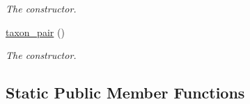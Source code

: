 \begin{DoxyCompactItemize}
\begin{DoxyCompactList}\small\item\em The constructor. \end{DoxyCompactList}\item 
\hypertarget{classtaxon__pair_a19f97e797d231c588255b23d380838ff}{
\hyperlink{classtaxon__pair_a19f97e797d231c588255b23d380838ff}{taxon\_\-pair} ()}
\label{classtaxon__pair_a19f97e797d231c588255b23d380838ff}

\begin{DoxyCompactList}\small\item\em The constructor. \end{DoxyCompactList}\end{DoxyCompactItemize}
\subsection*{Static Public Member Functions}
